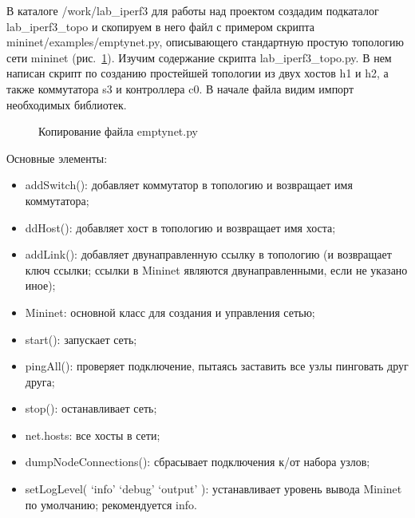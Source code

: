 \documentclass[
  english,
  russian,
  12pt,
  a4paper,
  DIV=11,
  numbers=noendperiod]{scrreprt}
\providecommand{\tightlist}{%
  \setlength{\itemsep}{0pt}\setlength{\parskip}{0pt}}
\begin{document}
В каталоге /work/lab\_iperf3 для работы над проектом создадим подкаталог
lab\_iperf3\_topo и скопируем в него файл с примером скрипта
mininet/examples/emptynet.py, описывающего стандартную простую топологию
сети mininet (рис.~\ref{fig-001}). Изучим содержание скрипта
lab\_iperf3\_topo.py. В нем написан скрипт по созданию простейшей
топологии из двух хостов h1 и h2, а также коммутатора s3 и контроллера
c0. В начале файла видим импорт необходимых библиотек.

\begin{figure}


\caption{\label{fig-001}Копирование файла emptynet.py}

\end{figure}%

Основные элементы:

\begin{itemize}
\tightlist
\item
  addSwitch(): добавляет коммутатор в топологию и возвращает имя
  коммутатора;
\item
  ddHost(): добавляет хост в топологию и возвращает имя хоста;
\item
  addLink(): добавляет двунаправленную ссылку в топологию (и возвращает
  ключ ссылки; ссылки в Mininet являются двунаправленными, если не
  указано иное);
\item
  Mininet: основной класс для создания и управления сетью;
\item
  start(): запускает сеть;
\item
  pingAll(): проверяет подключение, пытаясь заставить все узлы пинговать
  друг друга;
\item
  stop(): останавливает сеть;
\item
  net.hosts: все хосты в сети;
\item
  dumpNodeConnections(): сбрасывает подключения к/от набора узлов;
\item
  setLogLevel( \enquote*{info} \textbar{} \enquote*{debug} \textbar{}
  \enquote*{output} ): устанавливает уровень вывода Mininet по
  умолчанию; рекомендуется info.
\end{itemize}
\end{document}

